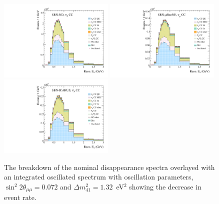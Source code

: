 \begin{figure}[h!]
  {\includegraphics[width=0.49\textwidth]{figures-chap6/spectra/numu_disapp_overlay_dmsq_1.32_sinsq2th_0.072_spectrum_sbn_nd_BNB_FHC_0_modes.pdf}}
  {\includegraphics[width=0.49\textwidth]{figures-chap6/spectra/numu_disapp_overlay_dmsq_1.32_sinsq2th_0.072_spectrum_sbn_uboone_BNB_FHC_1_modes.pdf}}
  {\includegraphics[width=0.49\textwidth]{figures-chap6/spectra/numu_disapp_overlay_dmsq_1.32_sinsq2th_0.072_spectrum_sbn_icarus_BNB_FHC_2_modes.pdf}}
  \captionsetup{width=0.49\textwidth}
  \parbox[b]{0.49\textwidth}%
  {
    \caption[SBN \numu CC inclusive reconstructed neutrino energy spectra with oscillated spectrum overlayed.]{The breakdown of the nominal \numu disappearance spectra overlayed with an integrated oscillated spectrum with oscillation parameters, $\sin^2{2\theta_{\mu \mu}} = 0.072$ and $\Delta m^2_{41} = 1.32$~eV$^2$ showing the decrease in event rate.\\\phantom{.}\\\phantom{.}\\\phantom{.}\\}
    \label{fig:numu_disapp_spectra} 
  }
\end{figure}

